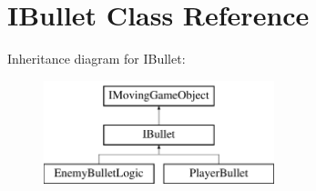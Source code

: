 \hypertarget{class_i_bullet}{}\section{I\+Bullet Class Reference}
\label{class_i_bullet}
Inheritance diagram for I\+Bullet\+:\begin{figure}[H]
\begin{center}
\leavevmode
\includegraphics[height=3.000000cm]{class_i_bullet}
\end{center}
\end{figure}
